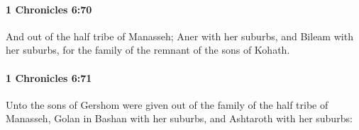 		\paragraph{1 Chronicles 6:70} %
			\label{1CHRONICLES-6-70}

			And out of the half tribe of Manasseh; Aner with her suburbs, and Bileam with her suburbs, for the family of the remnant of the sons of Kohath.


		\paragraph{1 Chronicles 6:71} %
			\label{1CHRONICLES-6-71}

			Unto the sons of Gershom were given out of the family of the half tribe of Manasseh, Golan in Bashan with her suburbs, and Ashtaroth with her suburbs:


